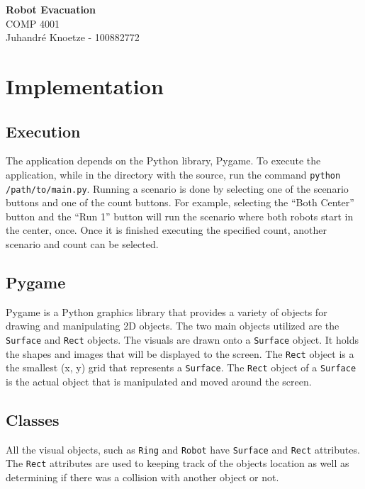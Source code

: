\documentclass[12pt,letterpaper]{article}
\begin{document}
    \begin{center}
        {\Large\bf Robot Evacuation} \\
        \vspace{0.25em}
        {\large COMP 4001}\\
        \vspace{0.25em}
        Juhandr\'{e} Knoetze - 100882772 \\
    \end{center}

    \section{Implementation}
    \subsection{Execution}
        The application depends on the Python library, Pygame. To execute the application, while in the directory with the source, run the command \texttt{python /path/to/main.py}. Running a scenario is done by selecting one of the scenario buttons and one of the count buttons. For example, selecting the ``Both Center'' button and the ``Run 1'' button will run the scenario where both robots start in the center, once. Once it is finished executing the specified count, another scenario and count can be selected.
        
    \subsection{Pygame}
        Pygame is a Python graphics library that provides a variety of objects for drawing and manipulating 2D objects. The two main objects utilized are the \texttt{Surface} and \texttt{Rect} objects. The visuals are drawn onto a \texttt{Surface} object. It holds the shapes and images that will be displayed to the screen. The \texttt{Rect} object is a the smallest (x, y) grid that represents a \texttt{Surface}. The \texttt{Rect} object of a \texttt{Surface} is the actual object that is manipulated and moved around the screen.
    
    \subsection{Classes}
        All the visual objects, such as \texttt{Ring} and \texttt{Robot} have \texttt{Surface} and \texttt{Rect} attributes. The \texttt{Rect} attributes are used to keeping track of the objects location as well as determining if there was a collision with another object or not.
    
\end{document}
